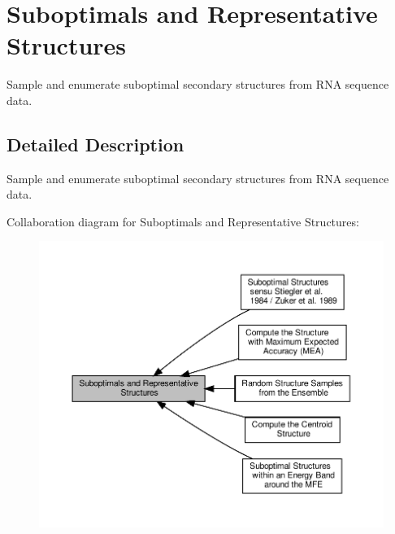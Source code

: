 \hypertarget{group__subopt__and__representatives}{}\section{Suboptimals and Representative Structures}
\label{group__subopt__and__representatives}


Sample and enumerate suboptimal secondary structures from R\+NA sequence data.  




\subsection{Detailed Description}
Sample and enumerate suboptimal secondary structures from R\+NA sequence data. 

Collaboration diagram for Suboptimals and Representative Structures\+:
\nopagebreak
\begin{figure}[H]
\begin{center}
\leavevmode
\includegraphics[width=350pt]{group__subopt__and__representatives}
\end{center}
\end{figure}
